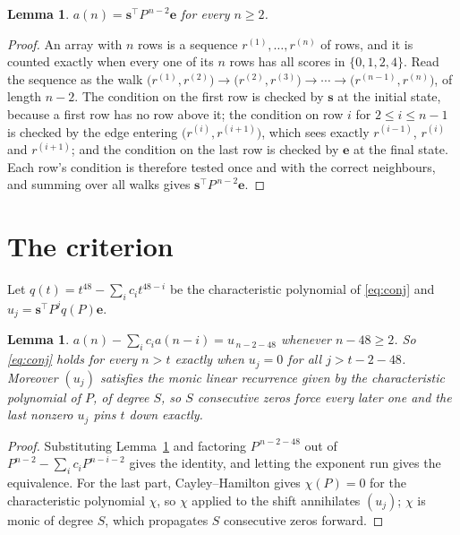 \documentclass[11pt,a4paper]{article}
\theoremstyle{plain}
\newtheorem{lemma}[theorem]{Lemma}
\theoremstyle{definition}
\begin{document}
\begin{lemma}\label{lem:walk}
$a(n)=\mathbf{s}^{\!\top}P^{\,n-2}\mathbf{e}$ for every $n\ge2$.
\end{lemma}

\begin{proof}
An array with $n$ rows is a sequence $r^{(1)},\dots,r^{(n)}$ of rows, and it is counted
exactly when every one of its $n$ rows has all scores in $\{0,1,2,4\}$. Read the sequence as the
walk $\bigl(r^{(1)},r^{(2)}\bigr)\to\bigl(r^{(2)},r^{(3)}\bigr)\to\cdots\to
\bigl(r^{(n-1)},r^{(n)}\bigr)$, of length $n-2$. The condition on the first row is
checked by $\mathbf{s}$ at the initial state, because a first row has no row above it; the
condition on row $i$ for $2\le i\le n-1$ is checked by the edge entering
$\bigl(r^{(i)},r^{(i+1)}\bigr)$, which sees exactly $r^{(i-1)}$, $r^{(i)}$ and
$r^{(i+1)}$; and the condition on the last row is checked by $\mathbf{e}$ at the final
state. Each row's condition is therefore tested once and with the correct neighbours, and
summing over all walks gives $\mathbf{s}^{\!\top}P^{\,n-2}\mathbf{e}$.
\end{proof}

\section{The criterion}

Let $q(t)=t^{48}-\sum_i c_i t^{48-i}$ be the characteristic polynomial of
\eqref{eq:conj} and $u_j=\mathbf{s}^{\!\top}P^{j}q(P)\mathbf{e}$.

\begin{lemma}\label{lem:crit}
$a(n)-\sum_i c_i a(n-i)=u_{\,n-2-48}$ whenever $n-48\ge2$. So \eqref{eq:conj}
holds for every $n>t$ exactly when $u_j=0$ for all $j>t-2-48$. Moreover $(u_j)$
satisfies the monic linear recurrence given by the characteristic polynomial of $P$, of
degree $S$, so $S$ consecutive zeros force every later one and the last nonzero $u_j$ pins
$t$ down exactly.
\end{lemma}

\begin{proof}
Substituting Lemma~\ref{lem:walk} and factoring $P^{\,n-2-48}$ out of
$P^{n-2}-\sum_i c_i P^{n-i-2}$ gives the identity, and letting the exponent run gives the
equivalence. For the last part, Cayley--Hamilton gives $\chi(P)=0$ for the characteristic
polynomial $\chi$, so $\chi$ applied to the shift annihilates $(u_j)$; $\chi$ is monic of
degree $S$, which propagates $S$ consecutive zeros forward.
\end{proof}
\end{document}
